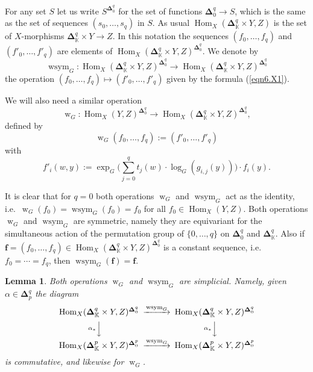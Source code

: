\documentclass[10pt]{amsart}
\newtheorem{lem}[equation]{Lemma}
\theoremstyle{definition}
\numberwithin{equation}{section}
\newcommand{\opn}{\operatorname}
\newcommand{\mbb}[1]{\mathbb{#1}}
\newcommand{\bsym}[1]{\boldsymbol{#1}}
\newcommand{\K}{\mbb{K}}
\begin{document}
For any set $S$ let us write 
$S^{\bsym{\Delta}^q_{0}}$ for the set of functions 
$\bsym{\Delta}^q_{0} \to S$, which is the same as the set of
sequences $(s_0, \ldots, s_q)$ in $S$. As usual 
$\opn{Hom}_X(\bsym{\Delta}^q_{\K} \times Y, Z)$
is the set of $X$-morphisms $\bsym{\Delta}^q_{\K} \times Y \to Z$. 
In this notation the sequences
$(f_0, \ldots, f_q)$ and $(f'_0, \ldots, f'_q)$ are
elements of 
$\opn{Hom}_X(\bsym{\Delta}^q_{\K} \times Y, Z)
^{\bsym{\Delta}^q_{0}}$. We denote by
\[ \opn{wsym}_G : \opn{Hom}_X(\bsym{\Delta}^q_{\K} \times Y, Z)
^{\bsym{\Delta}^q_{0}} \to
\opn{Hom}_X(\bsym{\Delta}^q_{\K} \times Y, Z)
^{\bsym{\Delta}^q_{0}} \]
the operation
$(f_0, \ldots, f_q) \mapsto (f'_0, \ldots, f'_q)$
given by the formula (\ref{eqn6.X1}). 

We will also need a similar operation
\[ \opn{w}_G : \opn{Hom}_X(Y, Z)^{\bsym{\Delta}^q_{0}} \to
\opn{Hom}_X(\bsym{\Delta}^q_{\K} \times Y, Z)
^{\bsym{\Delta}^q_{0}} , \]
defined by
\[ \opn{w}_G(f_0, \ldots, f_q) := (f'_0, \ldots, f'_q) \]
with
\begin{equation} \label{eqn1.3}
f'_i(w, y) := \opn{exp}_G \Big( \sum_{j=0}^q t_j(w) \cdot
\opn{log}_G(g_{i, j}(y)) \Big) \cdot f_i(y) .
\end{equation}

It is clear that for $q = 0$ both operations 
$\opn{w}_G$ and $\opn{wsym}_G$ act as the identity, i.e.\ 
$\opn{w}_G(f_0) = \opn{wsym}_G(f_0) = f_0$
for all $f_0 \in \opn{Hom}_X(Y, Z)$.
Both operations $\opn{w}_G$ and $\opn{wsym}_G$ are symmetric, 
namely they are equivariant for the simultaneous action of the 
permutation group of $\{ 0, \ldots, q \}$ on 
$\bsym{\Delta}^q_{0}$ and $\bsym{\Delta}^q_{\K}$.
Also if 
$\bsym{f} = (f_0, \ldots, f_q) \in 
\opn{Hom}_X(\bsym{\Delta}^q_{\K} \times Y, Z)
^{\bsym{\Delta}^q_{0}}$
is a constant sequence, i.e.\ $f_0 = \cdots = f_q$, then 
$\opn{wsym}_G(\bsym{f}) = \bsym{f}$.

\begin{lem} \label{lem6.X1}
Both operations $\opn{w}_G$ and $\opn{wsym}_G$ are simplicial.
Namely, given $\alpha \in \bsym{\Delta}^q_{p}$ the diagram
\[ \begin{CD}
\opn{Hom}_X(\bsym{\Delta}^q_{\K} \times Y, Z)
^{\bsym{\Delta}^q_{0}}
@>{\opn{wsym}_G}>>
\opn{Hom}_X(\bsym{\Delta}^q_{\K} \times Y, Z)
^{\bsym{\Delta}^q_{0}} \\
@V{\alpha_*}VV @V{\alpha_*}VV \\
\opn{Hom}_X(\bsym{\Delta}^p_{\K} \times Y, Z)
^{\bsym{\Delta}^p_{0}}
@>{\opn{wsym}_G}>>
\opn{Hom}_X(\bsym{\Delta}^p_{\K} \times Y, Z)
^{\bsym{\Delta}^p_{0}}
\end{CD} \]
is commutative, and likewise for $\opn{w}_G$.
\end{lem}
\end{document}
